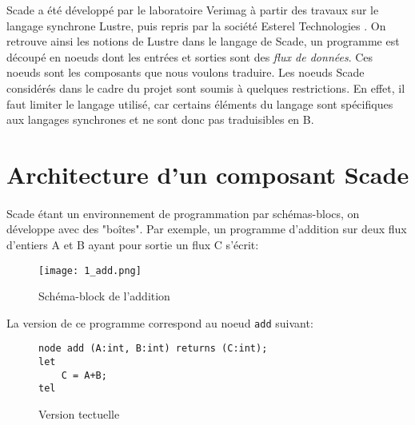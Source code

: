 


Scade a été développé par le laboratoire Verimag à partir des travaux sur
le langage synchrone Lustre, puis repris par la société Esterel Technologies \cite{Estech}. On retrouve
ainsi les notions de Lustre dans le langage de Scade, un programme est découpé
en noeuds dont les entrées et sorties sont des \emph{flux de données}. Ces
noeuds sont les composants que nous voulons traduire. 
Les noeuds Scade considérés dans le cadre du projet \cercles  sont
soumis à quelques restrictions. En effet, il faut limiter le langage
utilisé, car certains éléments du langage sont spécifiques aux
langages synchrones et ne sont donc pas traduisibles en B.\\


\section{Architecture d'un composant Scade}

\paragraph{}
Scade étant un environnement de programmation par schémas-blocs, on
développe avec des "boîtes". Par exemple, un programme d'addition sur deux flux d'entiers A
et B ayant pour sortie un flux C s'écrit:

\begin{figure}[h]
\begin{center}
\texttt{[image: 1\_add.png]}
\end{center}
\caption{Schéma-block de l'addition}
\end{figure}

La version de ce programme correspond au noeud \texttt{add} suivant:

\begin{figure}[h]
\begin{center}
\begin{verbatim}
node add (A:int, B:int) returns (C:int);
let 
    C = A+B;
tel
\end{verbatim}
\end{center}
\caption{Version tectuelle}
\end{figure}

